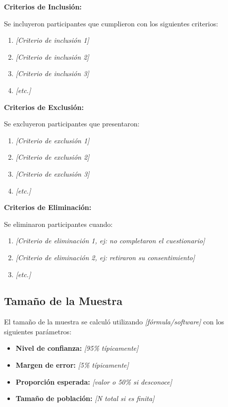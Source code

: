 \textbf{Criterios de Inclusión:}

Se incluyeron participantes que cumplieron con los siguientes criterios:

\begin{enumerate}
    \item \textit{[Criterio de inclusión 1]}
    \item \textit{[Criterio de inclusión 2]}
    \item \textit{[Criterio de inclusión 3]}
    \item \textit{[etc.]}
\end{enumerate}

\textbf{Criterios de Exclusión:}

Se excluyeron participantes que presentaron:

\begin{enumerate}
    \item \textit{[Criterio de exclusión 1]}
    \item \textit{[Criterio de exclusión 2]}
    \item \textit{[Criterio de exclusión 3]}
    \item \textit{[etc.]}
\end{enumerate}

\textbf{Criterios de Eliminación:}

Se eliminaron participantes cuando:

\begin{enumerate}
    \item \textit{[Criterio de eliminación 1, ej: no completaron el cuestionario]}
    \item \textit{[Criterio de eliminación 2, ej: retiraron su consentimiento]}
    \item \textit{[etc.]}
\end{enumerate}

\subsection{Tamaño de la Muestra}
\label{subsec:tamaño_muestra}

El tamaño de la muestra se calculó utilizando \textit{[fórmula/software]} con los siguientes parámetros:

\begin{itemize}
    \item \textbf{Nivel de confianza:} \textit{[95\% típicamente]}
    \item \textbf{Margen de error:} \textit{[5\% típicamente]}
    \item \textbf{Proporción esperada:} \textit{[valor o 50\% si desconoce]}
    \item \textbf{Tamaño de población:} \textit{[N total si es finita]}
\end{itemize}

